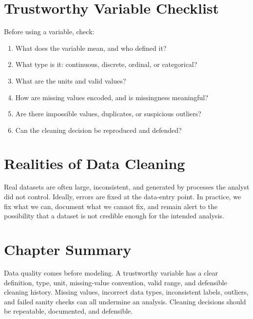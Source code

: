 {\section{Trustworthy Variable Checklist}

Before using a variable, check:
\begin{enumerate}
  \item What does the variable mean, and who defined it?
  \item What type is it: continuous, discrete, ordinal, or categorical?
  \item What are the units and valid values?
  \item How are missing values encoded, and is missingness meaningful?
  \item Are there impossible values, duplicates, or suspicious outliers?
  \item Can the cleaning decision be reproduced and defended?
\end{enumerate}

\section{Realities of Data Cleaning}

Real datasets are often large, inconsistent, and generated by processes the analyst did not control.  Ideally, errors are fixed at the data-entry point.  In practice, we fix what we can, document what we cannot fix, and remain alert to the possibility that a dataset is not credible enough for the intended analysis.

\section{Chapter Summary}

Data quality comes before modeling.  A trustworthy variable has a clear definition, type, unit, missing-value convention, valid range, and defensible cleaning history.  Missing values, incorrect data types, inconsistent labels, outliers, and failed sanity checks can all undermine an analysis.  Cleaning decisions should be repeatable, documented, and defensible.
}
